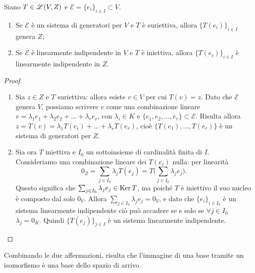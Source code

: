 \begin{teorema}
	Siano $T\in\mathscr L(V,Z)$ e $\mathcal E=\{e_i\}_{i\in I}\subset V$.
	\begin{enumerate}
		\item Se $\mathcal E$ è un sistema di generatori per $V$ e $T$ è suriettiva, allora $\{T(e_i)\}_{i\in I}$ genera $Z$;
		\item Se $\mathcal E$ è linearmente indipendente in $V$ e $T$ è iniettiva, allora $\{T(e_i)\}_{i\in I}$ è linearmente indipendente in $Z$.
	\end{enumerate}
\end{teorema}
\begin{proof}
	\begin{enumerate}
		\item Sia $z\in Z$ e $T$ suriettiva: allora esiste $v\in V$ per cui $T(v)=z$.
			Dato che $\mathcal E$ genera $V$, possiamo scrivere $v$ come una combinazione lineare $v=\lambda_1e_1+\lambda_2e_2+\dots+\lambda_re_r$, con $\lambda_i\in K$ e $\{e_1,e_2,\dots,e_r\}\subset\mathcal E$.
			Risulta allora $z=T(v)=\lambda_1T(e_i)+\dots+\lambda_rT(e_r)$, cioè $\{T(e_1),\dots,T(e_r)\}$ è un sistema di generatori per $Z$.
		\item Sia ora $T$ iniettiva e $I_0$ un sottoinsieme di cardinalità finita di $I$.
			Consideriamo una combinazione lineare dei $T(e_i)$ nulla: per linearità
			\begin{equation*}
				0_Z=\sum_{j\in I_0}\lambda_jT(e_j)=T\bigg(\sum_{j\in I_0}\lambda_je_j\bigg).
			\end{equation*}
			Questo significa che $\sum_{j\in I_0}\lambda_je_j\in\operatorname{Ker} T$, ma poiché $T$ è iniettivo il suo nucleo è composto dal solo $0_V$.
			Allora $\sum_{j\in I_0}\lambda_je_j=0_V$, e dato che $\{e_i\}_{i\in I_0}$ è un sistema linearmente indipendente ciò può accadere se e solo se $\forall j\in I_0$ $\lambda_j=0_K$.
			Quindi $\{T(e_j)\}_{j\in I}$ è un sistema linearmente indipendente.\qedhere
	\end{enumerate}
\end{proof}
Combinando le due affermazioni, risulta che l'immagine di una base tramite un isomorfismo è una base dello spazio di arrivo.

